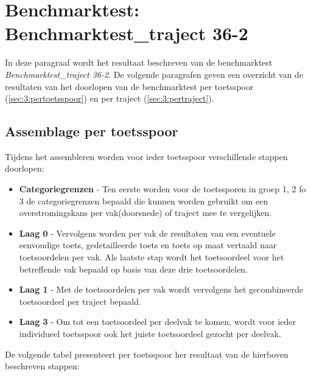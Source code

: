 \section{Benchmarktest: Benchmarktest\_traject 36-2}
	\label{ch:benchmarktTest3}
In deze paragraaf wordt het resultaat beschreven van de benchmarktest \textit{Benchmarktest\_traject 36-2}. De volgende paragrafen geven een overzicht van de resultaten van het doorlopen van de benchmarktest per toetsspoor (\autoref{sec:3:pertoetsspoor}) en per traject (\autoref{sec:3:pertraject}).

\subsection{Assemblage per toetsspoor}
	\label{sec:3:pertoetsspoor}
Tijdens het assembleren worden voor ieder toetsspoor verschillende stappen doorlopen:
\begin{itemize}
	\item \textbf{Categoriegrenzen} - Ten eerste worden voor de toetssporen in groep 1, 2 fo 3 de categoriegrenzen bepaald die kunnen worden gebruikt om een overstromingskans per vak(doorsnede) of traject mee te vergelijken.
	\item \textbf{Laag 0} - Vervolgens worden per vak de resultaten van een eventuele eenvoudige toets, gedetailleerde toets en toets op maat vertaald naar toetsoordelen per vak. Als laatste stap wordt het toetsoordeel voor het betreffende vak bepaald op basis van deze drie toetsoordelen.
	\item \textbf{Laag 1} - Met de toetsoordelen per vak wordt vervolgens het gecombineerde toetsoordeel per traject bepaald.
	\item \textbf{Laag 3} - Om tot een toetsoordeel per deelvak te komen, wordt voor ieder individueel toetsspoor ook het juiste toetsoordeel gezocht per deelvak.
\end{itemize}

De volgende tabel presenteert per toetsspoor her resultaat van de hierboven beschreven stappen:

